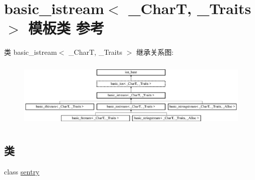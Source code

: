 \hypertarget{classbasic__istream}{}\section{basic\+\_\+istream$<$ \+\_\+\+CharT, \+\_\+\+Traits $>$ 模板类 参考}
\label{classbasic__istream}
类 basic\+\_\+istream$<$ \+\_\+\+CharT, \+\_\+\+Traits $>$ 继承关系图\+:\begin{figure}[H]
\begin{center}
\leavevmode
\includegraphics[height=3.263403cm]{classbasic__istream}
\end{center}
\end{figure}
\subsection*{类}
\begin{DoxyCompactItemize}
\item 
class \hyperlink{classbasic__istream_1_1sentry}{sentry}
\end{DoxyCompactItemize}
